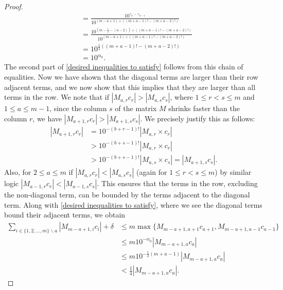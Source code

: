 \documentclass[12pt]{article}
\begin{document}
\begin{proof}
\begin{align*}
    &= \frac{10^{\gamma_{a}-\gamma_{a-1}}}{10^{(m-a+1) \times ((m+a-1)!-(m+a-2)!)} }  \\
    &=\frac{10^{(m-\frac{1}{2}-(a-2))\times((m+a-1)!-(m+a-2)!)} }{ 10^{(m-a+1) \times ((m+a-1)!-(m+a-2)!)}} \\
    &= 10^{\frac{1}{2}((m+a-1)!-(m+a-2)!)} \\
    &=10^{\alpha_a} .
\end{align*}
The second part of \eqref{desired inequalities to satisfy} follows from this chain of equalities. Now we have shown that the diagonal terms are larger than their row adjacent terms, and we now show that this implies that they are larger than all terms in the row. We note that if $|M_{a,r}c_r|>|M_{a,s} c_s|$, where $1 \leq r<s\leq m$ and $1 \leq a \leq m-1$, since the column $s$ of the matrix $M$ shrinks faster than the column $r$, we have $|M_{a+1,r}c_r| > |M_{a+1,s} c_s|$. We precisely justify this as follows:
\begin{align*}
    |M_{a+1,r}c_r|&=10^{-(b+r-1)!} |M_{a,r} \times c_r | \\
    &>10^{-(b+s-1)!} |M_{a,r} \times c_r | \\
     &>10^{-(b+s-1)!} |M_{a,s}  \times c_s |=|M_{a+1,s}c_s|.
\end{align*}
Also, for $2 \leq a \leq m$ if $|M_{a,r}c_r|<|M_{a,s} c_s|$ (again for $1 \leq r<s \leq m$) by similar logic $|M_{a-1,r}c_r|<|M_{a-1,s} c_s|$. This ensures that the terms in the row, excluding the non-diagonal term, can be bounded by the terms adjacent to the diagonal term. Along with \eqref{desired inequalities to satisfy}, where we see the diagonal terms bound their adjacent terms, we obtain
\begin{align*}
    \sum_{i \in \{1,2,...,m\}^{}
    \backslash a} |M_{m-a+1,i}{c_i}| +\delta &\leq m\max \{M_{m-a+1,a+1}c_{a+1},M_{m-a+1,a-1}c_{a-1} \} \\
    &\leq m 10^{-\alpha_a}  |M_{m-a+1,a}c_a| \\ &\leq m 10^{-\frac{1}{2}(m+a-1)} |M_{m-a+1,a}c_a|
     \\&< \frac{1}{4}|M_{m-a+1,a}c_a|.
\end{align*} 



\end{proof}
\end{document}

